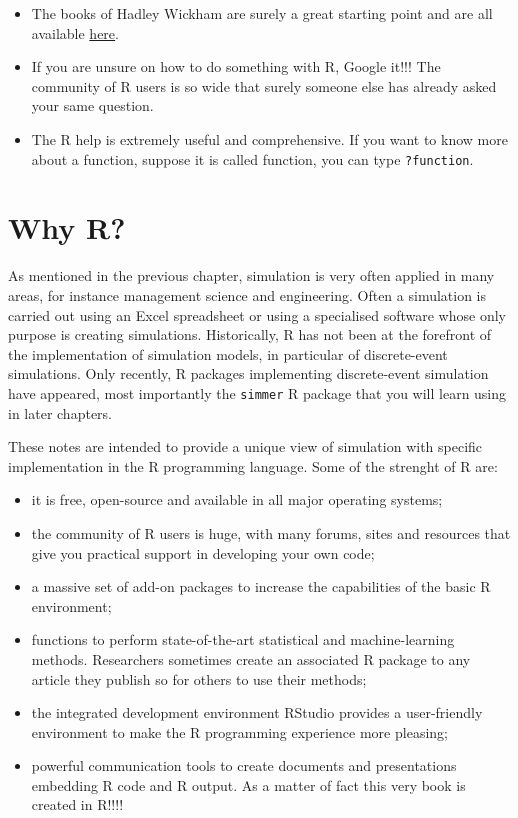 \documentclass[
]{book}
\begin{document}
\begin{itemize}
\item
  The books of Hadley Wickham are surely a great starting point and are all available \href{http://hadley.nz/}{here}.
\item
  If you are unsure on how to do something with R, Google it!!! The community of R users is so wide that surely someone else has already asked your same question.
\item
  The R help is extremely useful and comprehensive. If you want to know more about a function, suppose it is called function, you can type \texttt{?function}.
\end{itemize}

\hypertarget{why-r}{%
\section{Why R?}\label{why-r}}

As mentioned in the previous chapter, simulation is very often applied in many areas, for instance management science and engineering. Often a simulation is carried out using an Excel spreadsheet or using a specialised software whose only purpose is creating simulations. Historically, R has not been at the forefront of the implementation of simulation models, in particular of discrete-event simulations. Only recently, R packages implementing discrete-event simulation have appeared, most importantly the \texttt{simmer} R package that you will learn using in later chapters.

These notes are intended to provide a unique view of simulation with specific implementation in the R programming language. Some of the strenght of R are:

\begin{itemize}
\item
  it is free, open-source and available in all major operating systems;
\item
  the community of R users is huge, with many forums, sites and resources that give you practical support in developing your own code;
\item
  a massive set of add-on packages to increase the capabilities of the basic R environment;
\item
  functions to perform state-of-the-art statistical and machine-learning methods. Researchers sometimes create an associated R package to any article they publish so for others to use their methods;
\item
  the integrated development environment RStudio provides a user-friendly environment to make the R programming experience more pleasing;
\item
  powerful communication tools to create documents and presentations embedding R code and R output. As a matter of fact this very book is created in R!!!!
\end{itemize}
\end{document}
